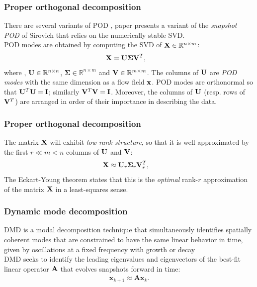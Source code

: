 \documentclass[12pt]{beamer}
\begin{document}
	\begin{frame}
	\frametitle{Proper orthogonal decomposition}
	There are several variants of POD , paper presents a variant of the \textit{snapshot
	POD} of Sirovich that relies on the numerically stable SVD. \\
POD modes are obtained by computing the SVD of ${{\bf X}\in\mathbb{R}^{n\times m}}$:
\begin{align}\label{Eq:SVD}
{\bf X}&={\bf U}\boldsymbol{\Sigma}{\bf V}^T,
\end{align}
where , ${\bf U}\in {\mathbb{R}}^{n\times n}$, $\boldsymbol{\Sigma}\in {\mathbb{R}}^{n\times m}$ and ${\bf V}\in {\mathbb{R}}^{m\times m}$.   
The columns of ${\bf U}$ are \emph{POD modes} with the same dimension as a flow field ${\bf x}$. 
POD modes are orthonormal so that ${\bf U}^T{\bf U} = {\bf I}$; similarly ${\bf V}^T{\bf V} = {\bf I}$.  
Moreover, the columns of ${\bf U}$ (resp. rows of ${\bf V}^T$) are arranged in order of their importance in describing the data. 
\end{frame}


\begin{frame}
	\frametitle{Proper orthogonal decomposition}
The matrix ${\bf X}$ will exhibit \emph{low-rank structure}, so that it is well approximated by the first $r\ll m<n$ columns of ${\bf U}$ and ${\bf V}$:
\begin{align}\label{Eq:SVD2}
{\bf X}&\approx{\bf U}_r\boldsymbol{\Sigma}_r{\bf V}_r^T,
\end{align}
The Eckart-Young theorem states that this is the \emph{optimal} rank-$r$ approximation of the matrix ${\bf X}$ in a least-squares sense. 
\end{frame}


\begin{frame} 
	\frametitle{Dynamic mode decomposition}
	DMD is a modal decomposition technique that simultaneously identifies spatially coherent
	modes that are constrained to have the same linear behavior in time, given by oscillations at a
	fixed frequency with growth or decay\\
	DMD seeks to identify the leading eigenvalues and eigenvectors of the best-fit linear operator ${\bf A}$ that evolves snapshots forward in time:
	\begin{align}
	\textbf{x}_{k+1} \approx \textbf{A} \textbf{x}_k.\label{Eq:DMD:Propagator}
	\end{align}
\end{frame}
\end{document}
